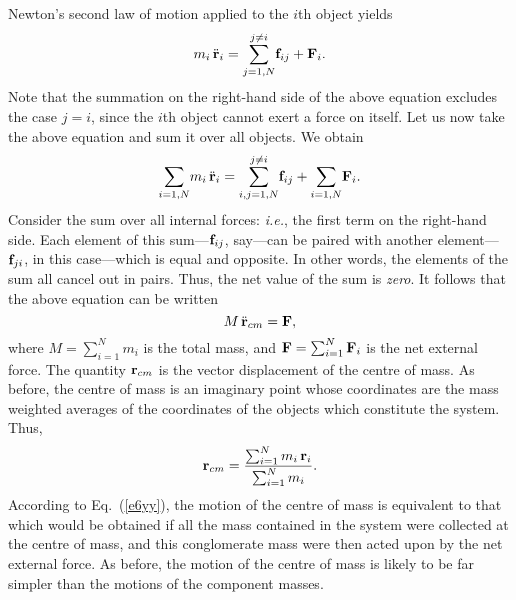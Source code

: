 Newton's second law of motion applied to the $i$th object yields
\begin{equation}
m_i\,\ddot{\bf r}_i = \sum_{j=1,N}^{j\neq i}\! {\bf f}_{ij} + {\bf F}_i.
\end{equation}
Note that the summation on the right-hand side of the above equation excludes the case
$j=i$, since the $i$th object cannot exert a force on itself. Let us now take the above
equation and sum it over all objects. We obtain
\begin{equation}
\sum_{i=1,N} \!m_i\,\ddot{\bf r}_i =\sum_{i,j=1,N}^{j\neq i}\! {\bf f}_{ij} + \sum_{i=1,N}\!
{\bf F}_i.
\end{equation}
Consider the sum  over all internal forces: {\em i.e.}, the first term on the right-hand side.
Each element of this sum---${\bf f}_{ij}$, say---can be paired with another element---${\bf f}_{ji}$,
in this case---which is equal and opposite. In other words,
 the elements of the sum all cancel out in pairs. Thus, the net value of the sum is {\em zero}.  
It follows that the above equation can be written
\begin{equation}\label{e6yy}
M\,\ddot{\bf r}_{cm}= {\bf F},
\end{equation}
where $M = \sum_{i=1}^N m_i$ is the total mass, and ${\bf F} = \sum_{i=1}^N {\bf F}_i$ is the
net external force. The quantity ${\bf r}_{cm}$ is the vector displacement of the centre of mass.
As before, the centre of mass is an imaginary point whose coordinates are the mass weighted
averages of the coordinates of the objects which constitute  the system. Thus,
\begin{equation}
{\bf r}_{cm} = \frac{\sum_{i=1}^N m_i\,{\bf r}_i}{\sum_{i=1}^N m_i}.
\end{equation}
According to Eq.~(\ref{e6yy}), the motion of the centre of mass is equivalent to that which
would be obtained if all the mass contained in the system were collected at the centre of mass, and
this conglomerate mass were then acted upon by the net external force. As before, the motion
of the centre of mass is likely to be far simpler than the motions of the component masses. 

